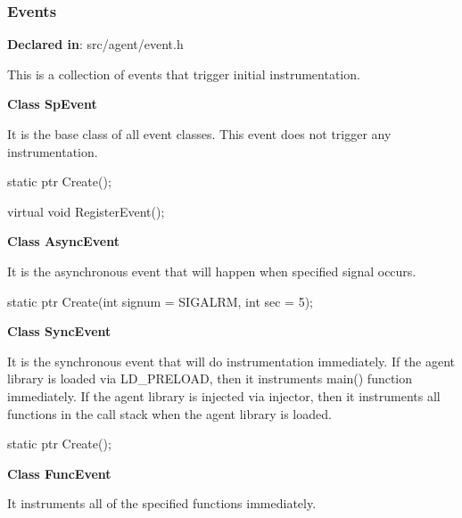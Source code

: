 \subsubsection{Events}
\textbf{Declared in}: src/agent/event.h

This is a collection of events that trigger initial instrumentation.

\textbf{Class SpEvent}

It is the base class of all event classes. This event does not trigger any
instrumentation.

\begin{apient}
static ptr Create();
\end{apient}

\begin{apient}
virtual void RegisterEvent();
\end{apient}

\textbf{Class AsyncEvent}

It is the asynchronous event that will happen when specified signal occurs.

\begin{apient}
static ptr Create(int signum = SIGALRM,
                  int sec = 5);
\end{apient}

\textbf{Class SyncEvent}

It is the synchronous event that will do instrumentation immediately.
If the agent library is loaded via LD\_PRELOAD, then it instruments main()
function immediately.
If the agent library is injected via injector, then it instruments all functions
in the call stack when the agent library is loaded.

\begin{apient}
static ptr Create();
\end{apient}

\textbf{Class FuncEvent}

It instruments all of the specified functions immediately.

